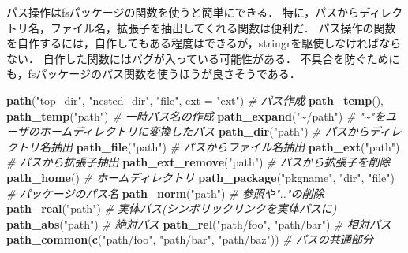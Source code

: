 \documentclass[
]{article}
\newenvironment{Shaded}{\begin{snugshade}}{\end{snugshade}}
\newcommand{\AttributeTok}[1]{\textcolor[rgb]{0.13,0.29,0.53}{#1}}
\newcommand{\CommentTok}[1]{\textcolor[rgb]{0.56,0.35,0.01}{\textit{#1}}}
\newcommand{\FunctionTok}[1]{\textcolor[rgb]{0.13,0.29,0.53}{\textbf{#1}}}
\newcommand{\NormalTok}[1]{#1}
\newcommand{\StringTok}[1]{\textcolor[rgb]{0.31,0.60,0.02}{#1}}
\begin{document}
パス操作はfsパッケージの関数を使うと簡単にできる．
特に，パスからディレクトリ名，ファイル名，拡張子を抽出してくれる関数は便利だ．
パス操作の関数を自作するには，自作してもある程度はできるが，stringrを駆使しなければならない．
自作した関数にはバグが入っている可能性がある．
不具合を防ぐためにも，fsパッケージのパス関数を使うほうが良さそうである．

\begin{Shaded}
\begin{Highlighting}[]
\FunctionTok{path}\NormalTok{(}\StringTok{"top\_dir"}\NormalTok{, }\StringTok{"nested\_dir"}\NormalTok{, }\StringTok{"file"}\NormalTok{, }\AttributeTok{ext =} \StringTok{"ext"}\NormalTok{)  }\CommentTok{\# パス作成   }
\FunctionTok{path\_temp}\NormalTok{(), }\FunctionTok{path\_temp}\NormalTok{(}\StringTok{"path"}\NormalTok{)                      }\CommentTok{\# 一時パス名の作成   }
\FunctionTok{path\_expand}\NormalTok{(}\StringTok{"\textasciitilde{}/path"}\NormalTok{)                               }\CommentTok{\# "\textasciitilde{}"をユーザのホームディレクトリに変換したパス   }
\FunctionTok{path\_dir}\NormalTok{(}\StringTok{"path"}\NormalTok{)                                    }\CommentTok{\# パスからディレクトリ名抽出   }
\FunctionTok{path\_file}\NormalTok{(}\StringTok{"path"}\NormalTok{)                                   }\CommentTok{\# パスからファイル名抽出   }
\FunctionTok{path\_ext}\NormalTok{(}\StringTok{"path"}\NormalTok{)                                    }\CommentTok{\# パスから拡張子抽出   }
\FunctionTok{path\_ext\_remove}\NormalTok{(}\StringTok{"path"}\NormalTok{)                             }\CommentTok{\# パスから拡張子を削除   }
\FunctionTok{path\_home}\NormalTok{()                                         }\CommentTok{\# ホームディレクトリ   }
\FunctionTok{path\_package}\NormalTok{(}\StringTok{"pkgname"}\NormalTok{, }\StringTok{"dir"}\NormalTok{, }\StringTok{"file"}\NormalTok{)              }\CommentTok{\# パッケージのパス名   }
\FunctionTok{path\_norm}\NormalTok{(}\StringTok{"path"}\NormalTok{)                                   }\CommentTok{\# 参照や".."の削除   }
\FunctionTok{path\_real}\NormalTok{(}\StringTok{"path"}\NormalTok{)                                   }\CommentTok{\# 実体パス(シンボリックリンクを実体パスに)   }
\FunctionTok{path\_abs}\NormalTok{(}\StringTok{"path"}\NormalTok{)                                    }\CommentTok{\# 絶対パス}
\FunctionTok{path\_rel}\NormalTok{(}\StringTok{"path/foo"}\NormalTok{, }\StringTok{"path/bar"}\NormalTok{)                    }\CommentTok{\# 相対パス}
\FunctionTok{path\_common}\NormalTok{(}\FunctionTok{c}\NormalTok{(}\StringTok{"path/foo"}\NormalTok{, }\StringTok{"path/bar"}\NormalTok{, }\StringTok{"path/baz"}\NormalTok{))  }\CommentTok{\# パスの共通部分   }

\end{Highlighting}
\end{Shaded}
\end{document}
